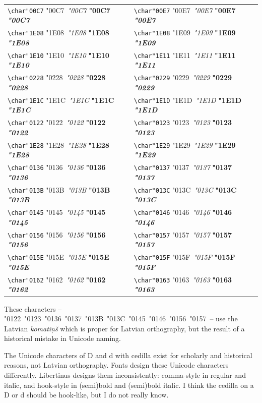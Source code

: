 \documentclass[landscape]{article}
\newcommand{\ribbiline}[1]{#1\ 
	{\itshape #1}
	{\bfseries #1}
	{\itshape\bfseries #1}}
\begin{document}
\begin{tabular}{ll}
\verb|\char"00C7| \ribbiline{\char"00C7} & 
\verb|\char"00E7| \ribbiline{\char"00E7} \\
\verb|\char"1E08| \ribbiline{\char"1E08} &
\verb|\char"1E08| \ribbiline{\char"1E09} \\
\verb|\char"1E10| \ribbiline{\char"1E10} &
\verb|\char"1E11| \ribbiline{\char"1E11} \\
\verb|\char"0228| \ribbiline{\char"0228} &
\verb|\char"0229| \ribbiline{\char"0229} \\
\verb|\char"1E1C| \ribbiline{\char"1E1C} &
\verb|\char"1E1D| \ribbiline{\char"1E1D} \\
\verb|\char"0122| \ribbiline{\char"0122} &
\verb|\char"0123| \ribbiline{\char"0123} \\
\verb|\char"1E28| \ribbiline{\char"1E28} &
\verb|\char"1E29| \ribbiline{\char"1E29} \\
\verb|\char"0136| \ribbiline{\char"0136} &
\verb|\char"0137| \ribbiline{\char"0137} \\
\verb|\char"013B| \ribbiline{\char"013B} &
\verb|\char"013C| \ribbiline{\char"013C} \\
\verb|\char"0145| \ribbiline{\char"0145} &
\verb|\char"0146| \ribbiline{\char"0146} \\
\verb|\char"0156| \ribbiline{\char"0156} &
\verb|\char"0157| \ribbiline{\char"0157} \\
\verb|\char"015E| \ribbiline{\char"015E} &
\verb|\char"015F| \ribbiline{\char"015F} \\
\verb|\char"0162| \ribbiline{\char"0162} &
\verb|\char"0163| \ribbiline{\char"0163} \\
\end{tabular}

These characters  -- 
\char"0122\ \char"0123\
\char"0136\ \char"0137\
\char"013B\ \char"013C\
\char"0145\ \char"0146\
\char"0156\ \char"0157\
-- 
use the Latvian \textit{komatiņš}
which is proper for Latvian orthography, but the result of a historical mistake in Unicode naming.

The Unicode characters of D and d with cedilla exist for scholarly and historical reasons, not Latvian orthography.
Fonts design these Unicode characters differently. 
Libertinus designs them inconsistently: comma-style in regular and italic, and hook-style in (semi)bold and (semi)bold italic.
I think the cedilla on a D or d should be hook-like, but I do not really know.
\end{document}
